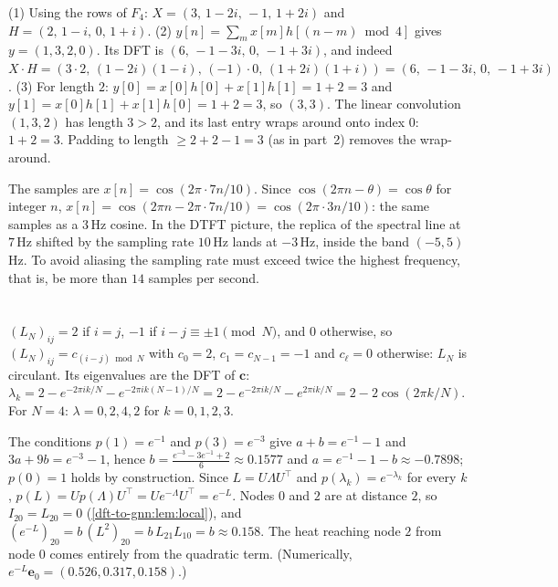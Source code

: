 (1) Using the rows of $F_4$: $X = (3,\,1-2i,\,-1,\,1+2i)$ and $H = (2,\,1-i,\,0,\,1+i)$.
(2) $y[n] = \sum_m x[m]h[(n-m)\bmod 4]$ gives $y = (1, 3, 2, 0)$. Its DFT is $(6,\,-1-3i,\,0,\,-1+3i)$, and indeed
$X\cdot H = (3\cdot2,\,(1-2i)(1-i),\,(-1)\cdot0,\,(1+2i)(1+i)) = (6,\,-1-3i,\,0,\,-1+3i)$.
(3) For length $2$: $y[0] = x[0]h[0] + x[1]h[1] = 1+2 = 3$ and $y[1] = x[0]h[1] + x[1]h[0] = 1+2 = 3$, so $(3,3)$. The linear convolution $(1,3,2)$ has length $3 > 2$, and its last entry wraps around onto index $0$: $1+2 = 3$. Padding to length $\ge 2+2-1 = 3$ (as in part~2) removes the wrap-around.

The samples are $x[n] = \cos(2\pi\cdot7n/10)$. Since $\cos(2\pi n - \theta) = \cos\theta$ for integer $n$, $x[n] = \cos(2\pi n - 2\pi\cdot 7n/10) = \cos(2\pi\cdot3n/10)$: the same samples as a $3$\,Hz cosine. In the DTFT picture, the replica of the spectral line at $7$\,Hz shifted by the sampling rate $10$\,Hz lands at $-3$\,Hz, inside the band $(-5,5)$\,Hz. To avoid aliasing the sampling rate must exceed twice the highest frequency, that is, be more than $14$ samples per second.

\section{}

$(L_N)_{ij} = 2$ if $i = j$, $-1$ if $i - j \equiv \pm1 \pmod N$, and $0$ otherwise, so $(L_N)_{ij} = c_{(i-j)\bmod N}$ with $c_0 = 2$, $c_1 = c_{N-1} = -1$ and $c_\ell = 0$ otherwise: $L_N$ is circulant. Its eigenvalues are the DFT of $\mathbf c$:
$\lambda_k = 2 - e^{-2\pi ik/N} - e^{-2\pi ik(N-1)/N} = 2 - e^{-2\pi ik/N} - e^{2\pi ik/N} = 2 - 2\cos(2\pi k/N)$.
For $N = 4$: $\lambda = 0, 2, 4, 2$ for $k = 0, 1, 2, 3$.

The conditions $p(1) = e^{-1}$ and $p(3) = e^{-3}$ give $a + b = e^{-1} - 1$ and $3a + 9b = e^{-3} - 1$, hence $b = \frac{e^{-3} - 3e^{-1} + 2}{6} \approx 0.1577$ and $a = e^{-1} - 1 - b \approx -0.7898$; $p(0) = 1$ holds by construction. Since $L = U\Lambda U^\top$ and $p(\lambda_k) = e^{-\lambda_k}$ for every $k$, $p(L) = Up(\Lambda)U^\top = Ue^{-\Lambda}U^\top = e^{-L}$.
Nodes $0$ and $2$ are at distance $2$, so $I_{20} = L_{20} = 0$ (\cref{dft-to-gnn:lem:local}), and $(e^{-L})_{20} = b\,(L^2)_{20} = b\,L_{21}L_{10} = b \approx 0.158$. The heat reaching node $2$ from node $0$ comes entirely from the quadratic term. (Numerically, $e^{-L}\mathbf e_0 = (0.526, 0.317, 0.158)$.)

